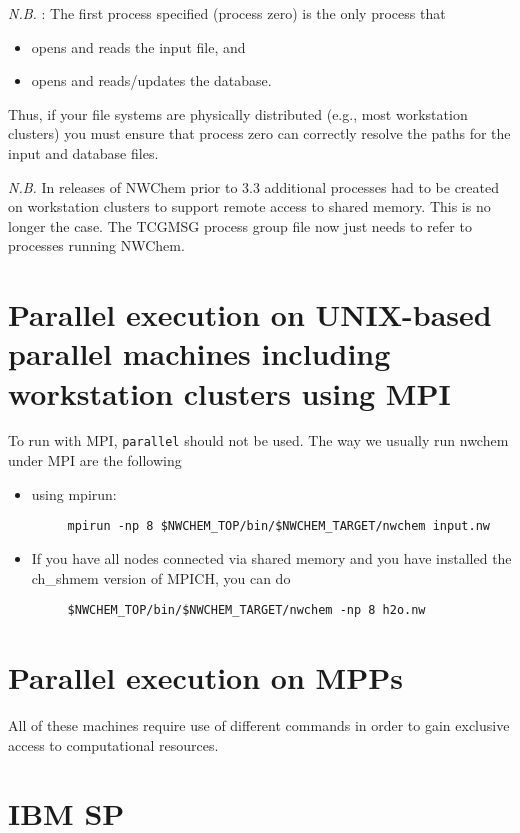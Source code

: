 {\em N.B.} : The first process specified (process zero) is the only
process that
\begin{itemize}
\item opens and reads the input file, and
\item opens and reads/updates the database.
\end{itemize}
Thus, if your file systems are physically distributed (e.g., most
workstation clusters) you must ensure that process zero can correctly
resolve the paths for the input and database files.

{\em N.B.}  In releases of NWChem prior to 3.3 additional processes
had to be created on workstation clusters to support remote access to
shared memory.  This is no longer the case.  The TCGMSG process group
file now just needs to refer to processes running NWChem.

\section{Parallel execution on UNIX-based parallel machines
including workstation clusters using MPI}

To run with MPI, \verb+parallel+ should not be used.  The way
we usually run nwchem under MPI are the following

\begin{itemize}
\item using mpirun:
\begin{verbatim}
     mpirun -np 8 $NWCHEM_TOP/bin/$NWCHEM_TARGET/nwchem input.nw
\end{verbatim}
\item If you have all nodes connected via shared memory
     and you have installed the ch\_shmem version of MPICH,
     you can do
\begin{verbatim}
     $NWCHEM_TOP/bin/$NWCHEM_TARGET/nwchem -np 8 h2o.nw
\end{verbatim}
\end{itemize}

\section{Parallel execution on MPPs}

All of these machines require use of different commands in order to
gain exclusive access to computational resources.

\section{IBM SP}

